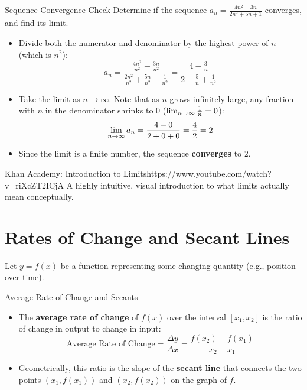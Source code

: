 \begin{examplebox}{Sequence Convergence Check}
Determine if the sequence $a_n = \frac{4n^2 - 3n}{2n^2 + 5n + 1}$ converges, and find its limit.
\begin{itemize}
    \item Divide both the numerator and denominator by the highest power of $n$ (which is $n^2$):
    $$a_n = \frac{\frac{4n^2}{n^2} - \frac{3n}{n^2}}{\frac{2n^2}{n^2} + \frac{5n}{n^2} + \frac{1}{n^2}} = \frac{4 - \frac{3}{n}}{2 + \frac{5}{n} + \frac{1}{n^2}}$$
    \item Take the limit as $n \to \infty$. Note that as $n$ grows infinitely large, any fraction with $n$ in the denominator shrinks to $0$ ($\lim_{n \to \infty} \frac{1}{n} = 0$):
    $$\lim_{n \to \infty} a_n = \frac{4 - 0}{2 + 0 + 0} = \frac{4}{2} = 2$$
    \item Since the limit is a finite number, the sequence \textbf{converges} to $2$.
\end{itemize}
\end{examplebox}

\begin{videocard}{Khan Academy: Introduction to Limits}{https://www.youtube.com/watch?v=riXcZT2ICjA}
A highly intuitive, visual introduction to what limits actually mean conceptually.
\end{videocard}

\section{Rates of Change and Secant Lines}

Let $y = f(x)$ be a function representing some changing quantity (e.g., position over time).

\begin{definitionbox}{Average Rate of Change and Secants}
\begin{itemize}
    \item The \textbf{average rate of change} of $f(x)$ over the interval $[x_1, x_2]$ is the ratio of change in output to change in input:
    $$\text{Average Rate of Change} = \frac{\Delta y}{\Delta x} = \frac{f(x_2) - f(x_1)}{x_2 - x_1}$$
    \item Geometrically, this ratio is the slope of the \textbf{secant line} that connects the two points $(x_1, f(x_1))$ and $(x_2, f(x_2))$ on the graph of $f$.
\end{itemize}
\end{definitionbox}

